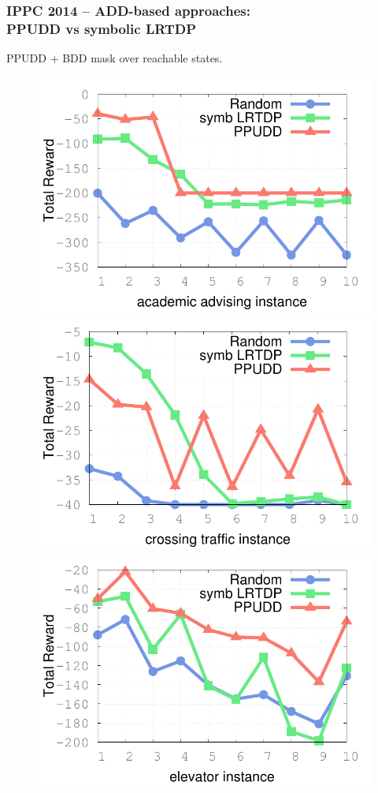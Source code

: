 \documentclass[12pt,svgnames,table]{beamer}
\begin{document}
\begin{frame}
\frametitle{IPPC 2014 -- ADD-based approaches:\\ 
PPUDD vs symbolic LRTDP}%
\vspace{-0.4cm}
PPUDD $+$ BDD mask over reachable states. \\
\vspace{-0.6cm}
\begin{figure}
\includegraphics[scale=0.3]{IPPC2014_results/academic_advising.pdf}
\includegraphics[scale=0.3]{IPPC2014_results/crossing_traffic.pdf} 
\includegraphics[scale=0.3]{IPPC2014_results/elevator.pdf} \\

\end{figure}
\end{frame}
\end{document}
